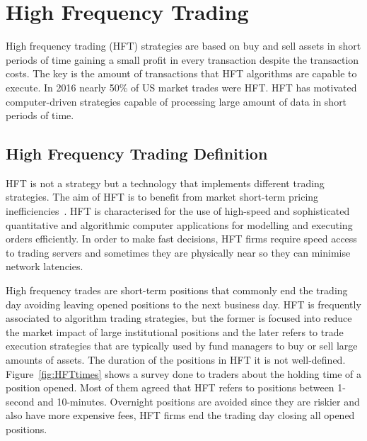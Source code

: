 \chapter{High Frequency Trading}
\label{chapter:HFT}

\vspace{0.5cm} 

High frequency trading (HFT) strategies are based on buy and sell assets in
short periods of time gaining a small profit in every transaction despite the
transaction costs. The key is the amount of transactions that HFT algorithms are
capable to execute.  In 2016 nearly 50\% of US market trades were HFT.  HFT
has motivated computer-driven strategies capable of processing large amount of
data in short periods of time. 


\section{High Frequency Trading Definition}

HFT is not a strategy but a technology that implements different trading
strategies. The aim of HFT is to benefit from market short-term pricing
inefficiencies~\cite{chlistalla2011}. HFT is characterised for the use of
high-speed and sophisticated quantitative and algorithmic computer applications
for modelling and executing orders efficiently. In order to make fast decisions,
HFT firms require speed access to trading servers and sometimes they are
physically near so they can minimise network latencies.

High frequency trades are short-term positions that commonly end the trading day
avoiding leaving opened positions to the next business day. HFT is frequently
associated to algorithm trading strategies, but the former is focused into
reduce the market impact of large institutional positions and the later refers
to trade execution strategies that are typically used by fund managers to buy or
sell large amounts of assets. The duration of the positions in HFT it is not
well-defined. Figure~\ref{fig:HFTtimes} shows a survey done to traders about the
holding time of a position opened. Most of them agreed that HFT refers to
positions between 1-second and 10-minutes. Overnight positions are avoided since
they are riskier and also have more expensive fees, HFT firms end the trading
day closing all opened positions.

